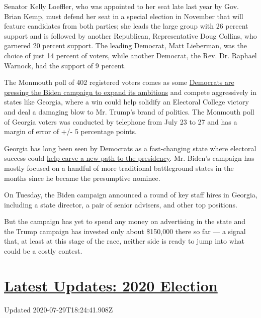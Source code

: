 Senator Kelly Loeffler, who was appointed to her seat late last year by
Gov. Brian Kemp, must defend her seat in a special election in November
that will feature candidates from both parties; she leads the large
group with 26 percent support and is followed by another Republican,
Representative Doug Collins, who garnered 20 percent support. The
leading Democrat, Matt Lieberman, was the choice of just 14 percent of
voters, while another Democrat, the Rev. Dr. Raphael Warnock, had the
support of 9 percent.

The Monmouth poll of 402 registered voters comes as some
\href{https://www.nytimes.com/2020/07/11/us/politics/trump-biden-2020-election.html}{Democrats
are pressing the Biden campaign to expand its ambitions} and compete
aggressively in states like Georgia, where a win could help solidify an
Electoral College victory and deal a damaging blow to Mr. Trump's brand
of politics. The Monmouth poll of Georgia voters was conducted by
telephone from July 23 to 27 and has a margin of error of +/- 5
percentage points.

Georgia has long been seen by Democrats as a fast-changing state where
electoral success could
\href{https://www.nytimes.com/2020/06/09/us/politics/georgia-primary-election-senate-race-jon-ossoff.html}{help
carve a new path to the presidency}. Mr. Biden's campaign has mostly
focused on a handful of more traditional battleground states in the
months since he became the presumptive nominee.

On Tuesday, the Biden campaign announced a round of key staff hires in
Georgia, including a state director, a pair of senior advisers, and
other top positions.

But the campaign has yet to spend any money on advertising in the state
and the Trump campaign has invested only about \$150,000 there so far
--- a signal that, at least at this stage of the race, neither side is
ready to jump into what could be a costly contest.

\hypertarget{latest-updates-2020-election}{%
\section{\texorpdfstring{\href{https://www.nytimes.com/2020/07/29/us/elections/biden-vs-trump.html?action=click\&pgtype=Article\&state=default\&region=MAIN_CONTENT_1\&context=storylines_live_updates}{Latest
Updates: 2020
Election}}{Latest Updates: 2020 Election}}\label{latest-updates-2020-election}}

Updated 2020-07-29T18:24:41.908Z

